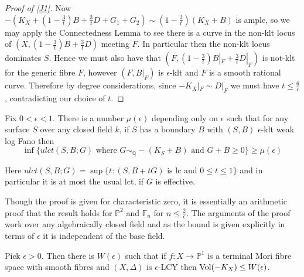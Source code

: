 \begin{proof}[Proof of \autoref{J1}]
	Now $-(K_{X}+(1-\frac{3}{t})B+\frac{3}{t}D+G_{1}+G_{2}) \sim (1-\frac{3}{t})(K_{X}+B)$ is ample, so we may apply the Connectedness Lemma to see there is a curve in the non-klt locus of $(X,(1-\frac{3}{t})B+\frac{3}{t}D)$ meeting $F$. In particular then the non-klt locus dominates $S$. Hence we must also have that $(F,(1-\frac{3}{t})B|_{F}+\frac{3}{t}D|_{F})$ is not-klt for the generic fibre $F$, however $(F,B|_{F})$ is $\epsilon$-klt and $F$ is a smooth rational curve. Therefore by degree considerations, since $-K_{X}|_{F} \sim D|_{F}$ we must have $t \leq \frac{6}{\epsilon}$, contradicting our choice of $t$. 
\end{proof}

\begin{theorem}\label{aj}\cite[Theorem 2.8]{jiang2014boundedness}
	Fix $0<\epsilon<1$. There is a number $\mu(\epsilon)$ depending only on $\epsilon$ such that for any surface $S$ over any closed field $k$, if $S$ has a boundary $B$ with $(S,B)$ $\epsilon$-klt weak log Fano then \[\inf \{ulct (S,B;G) \text{ where } G \sim_{\mathbb{Q}}-(K_{S}+B) \text{ and } G+B \geq 0\}\geq \mu(\epsilon)\]
\end{theorem}

Here $ulct (S,B;G)= \sup\{t\colon  (S,B+tG) \text{ is lc and } 0 \leq t \leq 1\}$ and in particular it is at most the usual lct, if $G$ is effective.

Though the proof is given for characteristic zero, it is essentially an arithmetic proof that the result holds for $\mathbb{P}^{2}$ and $\mathbb{F}_{n}$ for $n \leq \frac{2}{\epsilon}$. The arguments of the proof work over any algebraically closed field and as the bound is given explicitly in terms of $\epsilon$ it is independent of the base field.

\begin{theorem}\label{J2}
	Pick $\epsilon>0$. Then there is $W(\epsilon)$ such that if $f\colon X \to \mathbb{P}^{1}$ is a terminal Mori fibre space with smooth fibres and $(X,\Delta)$ is $\epsilon$-LCY then $\text{Vol}(-K_{X})\leq W(\epsilon)$.
\end{theorem}

